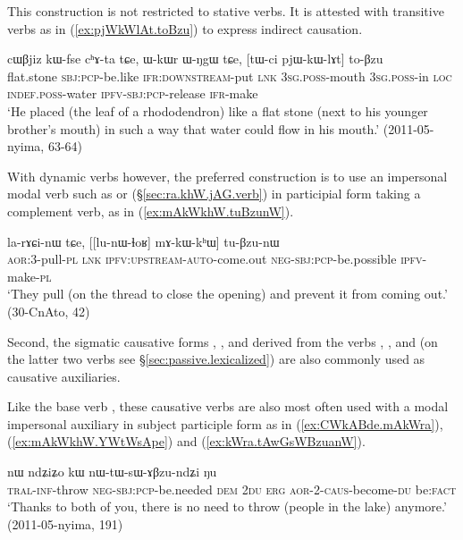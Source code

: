 This construction is not restricted to stative verbs. It is attested with transitive verbs as in  (\ref{ex:pjWkWlAt.toBzu}) to express indirect causation.

\begin{exe}
\ex  \label{ex:pjWkWlAt.toBzu}
\gll  cɯβjiz kɯ-fse cʰɤ-ta tɕe, ɯ-kɯr ɯ-ŋgɯ tɕe, [tɯ-ci pjɯ-kɯ-lɤt] to-βzu \\
flat.stone \textsc{sbj}:\textsc{pcp}-be.like \textsc{ifr}:\textsc{downstream}-put \textsc{lnk} \textsc{3sg}.\textsc{poss}-mouth \textsc{3sg}.\textsc{poss}-in \textsc{loc} \textsc{indef}.\textsc{poss}-water \textsc{ipfv}-\textsc{sbj}:\textsc{pcp}-release \textsc{ifr}-make \\
\glt `He placed (the leaf of a rhododendron) like a flat stone (next to his younger brother's mouth) in such a way that water could flow in his mouth.' (2011-05-nyima, 63-64)
\end{exe}

With dynamic verbs however, the preferred construction is to use an impersonal modal verb such as  or   (§\ref{sec:ra.khW.jAG.verb}) in participial form taking a complement verb, as in (\ref{ex:mAkWkhW.tuBzunW}).


\begin{exe}
\ex  \label{ex:mAkWkhW.tuBzunW}
\gll la-rɤɕi-nɯ tɕe, [[lu-nɯ-ɬoʁ] mɤ-kɯ-kʰɯ] tu-βzu-nɯ  \\
\textsc{aor}:3\flobv{}-pull-\textsc{pl} \textsc{lnk} \textsc{ipfv}:\textsc{upstream}-\textsc{auto}-come.out \textsc{neg}-\textsc{sbj}:\textsc{pcp}-be.possible \textsc{ipfv}-make-\textsc{pl} \\
\glt `They pull (on the thread to close the opening) and prevent it from coming out.' (30-CnAto, 42)
\end{exe}

Second, the sigmatic causative forms , ,  and  derived from the verbs , ,  and  (on the latter two verbs see §\ref{sec:passive.lexicalized}) are also commonly used as causative auxiliaries.

Like the base verb , these causative verbs are also most often used with a modal impersonal auxiliary in subject participle form as in (\ref{ex:CWkABde.mAkWra}), (\ref{ex:mAkWkhW.YWtWsApe}) and (\ref{ex:kWra.tAwGsWBzuanW}).

\begin{exe}
\ex  \label{ex:CWkABde.mAkWra}
\gll [ɕɯ-kɤ-βde mɤ-kɯ-ra] nɯ ndʑiʑo kɯ nɯ-tɯ-sɯ-ɤβzu-ndʑi ŋu  \\
\textsc{tral}-\textsc{inf}-throw  \textsc{neg}-\textsc{sbj}:\textsc{pcp}-be.needed \textsc{dem} \textsc{2du} \textsc{erg} \textsc{aor}-2-\textsc{caus}-become-\textsc{du} be:\textsc{fact} \\
\glt `Thanks to both of you, there is no need to throw (people in the lake) anymore.' (2011-05-nyima, 191)
\end{exe}


